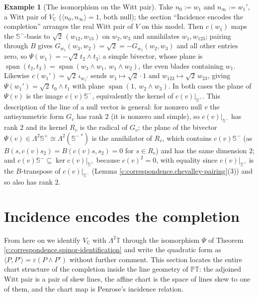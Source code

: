 \documentclass[11pt]{article}
\theoremstyle{definition}
\newtheorem{example}[theorem]{Example}
\theoremstyle{plain}
\newcommand{\changedmark}[2]{\marginpar{\raggedright\scriptsize\color{#1}#2}}
\providecommand{\C}{}\renewcommand{\C}{\mathbb{C}}
\providecommand{\CS}{}\renewcommand{\CS}{{\mathbb{S}^{+}}}
\providecommand{\CSm}{}\renewcommand{\CSm}{{\mathbb{S}^{-}}}
\providecommand{\PT}{}\renewcommand{\PT}{\mathbb{PT}}
\providecommand{\T}{}\renewcommand{\T}{\mathbb{T}}
\providecommand{\nInf}{}\renewcommand{\nInf}{n_\infty}
\providecommand{\nO}{}\renewcommand{\nO}{n_0}
\providecommand{\ip}{}\renewcommand{\ip}[2]{\langle #1, #2\rangle}
\begin{document}
\begin{example}[The isomorphism on the Witt pair]\label{c:note.correspondence.isomorphism-witt-pair}
\changedmark{gray}{reworded}
Take $\nO := w_1$ and $\nInf := w_1'$, a Witt pair of $V_\C$ ($\ip{\nO}{\nInf} = 1$, both null); the section ``Incidence encodes the completion'' arranges the real Witt pair of $V$ on this model. Then $c(w_1)$ maps the $\CSm$-basis to $\sqrt2\,(w_{12}, w_{13})$ on $w_2, w_3$ and annihilates $w_1, w_{123}$; pairing through $B$ gives $G_{w_1}(w_3, w_2) = \sqrt2 = -G_{w_1}(w_2, w_3)$ and all other entries zero, so $\Psi(w_1) = -\sqrt2\,t_2\wedge t_3$: a simple bivector, whose plane is $\operatorname{span}(t_2, t_3) = \operatorname{span}(w_3\wedge w_1,\ w_1\wedge w_2)$, the even blades containing $w_1$. Likewise $c(w_1') = \sqrt2\,\iota_{w_1'}$ sends $w_1 \mapsto \sqrt2\cdot 1$ and $w_{123}\mapsto \sqrt2\,w_{23}$, giving $\Psi(w_1') = \sqrt2\,t_0\wedge t_1$ with plane $\operatorname{span}(1,\ w_2\wedge w_3)$. In both cases the plane of $\Psi(v)$ is the image $c(v)\CSm$, equivalently the kernel of $c(v)|_\CS$. This description of the line of a null vector is general: for nonzero null $v$ the antisymmetric form $G_v$ has rank $2$ (it is nonzero and simple), so $c(v)|_{\CSm}$ has rank $2$ and its kernel $R_v$ is the radical of $G_v$; the plane of the bivector $\Psi(v) \in \Lambda^2\CS \cong \Lambda^2(\CSm^{\,*})$ is the annihilator of $R_v$, which contains $c(v)\CSm$ (as $B(s, c(v)s_2) = B(c(v)s, s_2) = 0$ for $s \in R_v$) and has the same dimension $2$; and $c(v)\CSm \subseteq \ker c(v)|_\CS$ because $c(v)^2 = 0$, with equality since $c(v)|_\CS$ is the $B$-transpose of $c(v)|_{\CSm}$ (Lemma \ref{c:correspondence.chevalley-pairing}(3)) and so also has rank $2$.
\end{example}

\section{Incidence encodes the completion}

\label{c:note.correspondence.setting-incidence-encodes-completion}
From here on we identify $V_\C$ with $\Lambda^2\T$ through the isomorphism $\Psi$ of Theorem \ref{c:correspondence.spinor-identification} and write the quadratic form as $\ip{P}{P'} = \varepsilon(P \wedge P')$ without further comment. This section locates the entire chart structure of the completion inside the line geometry of $\PT$: the adjoined Witt pair is a pair of skew lines, the affine chart is the space of lines skew to one of them, and the chart map is Penrose's incidence relation.
\end{document}
